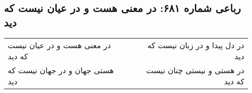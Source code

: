\begin{center}
\section*{رباعی شماره ۶۸۱: در معنی هست و در عیان نیست که دید}
\label{sec:0681}
\begin{longtable}{l p{0.5cm} r}
در معنی هست و در عیان نیست که دید
&&
در دل پیدا و در زبان نیست که دید
\\
هستی جهان و در جهان نیست که دید
&&
در هستی و نیستی چنان نیست که دید
\\
\end{longtable}
\end{center}
